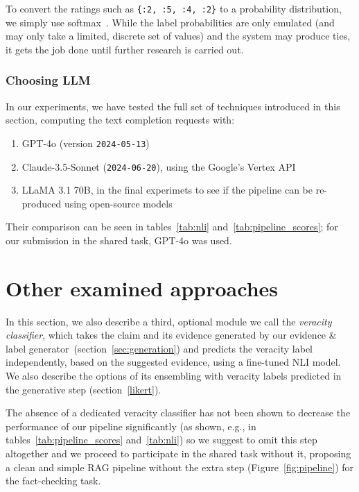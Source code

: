 To convert the ratings such as \texttt{\{:2, :5, :4, :2\}} to a probability distribution, we simply use softmax~\cite{NIPS1989_0336dcba}.
While the label probabilities are only emulated (and may only take a limited, discrete set of values) and the system may produce ties, it gets the job done until further research is carried out.

\subsubsection{Choosing LLM}
\label{sec:chosen_llms}
In our experiments, we have tested the full set of techniques introduced in this section, computing the text completion requests with:
\begin{enumerate}
    \item GPT-4o (version \texttt{2024-05-13})
    \item Claude-3.5-Sonnet (\texttt{2024-06-20}), using the Google's Vertex API
    \item LLaMA 3.1 70B, in the final experimets to see if the pipeline can be re-produced using open-source models
\end{enumerate} 

Their comparison can be seen in tables~\ref{tab:nli} and~\ref{tab:pipeline_scores}; for our submission in the \averitec{}  shared task, GPT-4o was used.

\section{Other examined approaches}
\label{sec:failed}
In this section, we also describe a third, optional module we call the \textit{veracity classifier}, which takes the claim and its evidence generated by our evidence \& label generator~(section~\ref{sec:generation}) and predicts the veracity label independently, based on the suggested evidence, using a fine-tuned NLI model.
We also describe the options of its ensembling with veracity labels predicted in the generative step (section~\ref{likert}).

The absence of a dedicated veracity classifier has not been shown to decrease the performance of our pipeline significantly (as shown, e.g., in tables~\ref{tab:pipeline_scores} and~\ref{tab:nli}) so we suggest to omit this step altogether and we proceed to participate in the \averitec{}  shared task without it, proposing a clean and simple RAG pipeline without the extra step (Figure~\ref{fig:pipeline}) for the fact-checking task.

